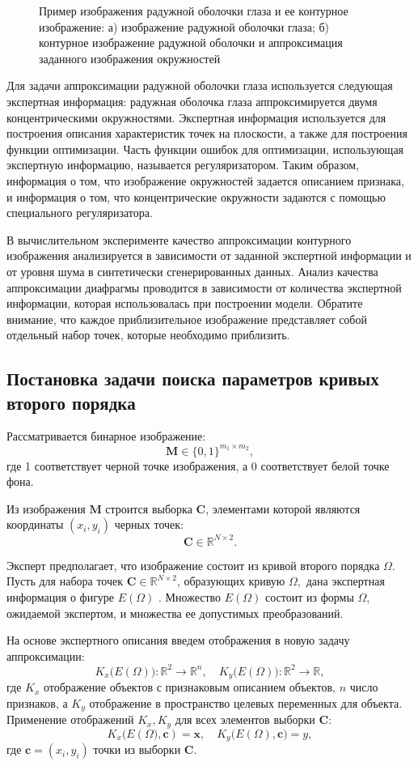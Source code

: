 \begin{figure}[h!]
\caption{Пример изображения радужной оболочки глаза и ее контурное изображение: а) изображение радужной оболочки глаза; б) контурное изображение радужной оболочки и аппроксимация заданного изображения окружностей}
\label{intro:fig1}
\end{figure}

Для задачи аппроксимации радужной оболочки глаза используется следующая экспертная информация: радужная оболочка глаза аппроксимируется двумя концентрическими окружностями. Экспертная информация используется для построения описания характеристик точек на плоскости, а также для построения функции оптимизации. Часть функции ошибок для оптимизации, использующая экспертную информацию, называется регуляризатором. Таким образом, информация о том, что изображение окружностей задается описанием признака, и информация о том, что концентрические окружности задаются с помощью специального регуляризатора.

В вычислительном эксперименте качество аппроксимации контурного изображения анализируется в зависимости от заданной экспертной информации и от уровня шума в синтетически сгенерированных данных. Анализ качества аппроксимации диафрагмы проводится в зависимости от количества экспертной информации, которая использовалась при построении модели. Обратите внимание, что каждое приблизительное изображение представляет собой отдельный набор точек, которые необходимо приблизить.

\subsection{Постановка задачи поиска параметров кривых второго порядка}
Рассматривается бинарное изображение:
\[
\mathbf{M} \in \{0, 1 \}^{m_1\times m_2},
\]
где 1 соответствует черной точке изображения, а 0 соответствует белой точке фона.

Из изображения $\mathbf{M}$ строится выборка $\mathbf{C}$, элементами которой являются координаты $(x_i, y_i)$ черных точек:
\[
\mathbf{C} \in\mathbb{R}^{N \times 2}.
\]

Эксперт предполагает, что изображение состоит из кривой второго порядка $\Omega$.
Пусть для набора точек $\mathbf{C}\in\mathbb{R}^{N \times 2}$, образующих кривую $\Omega,$ дана экспертная информация о фигуре $E(\Omega)$ .
Множество $E(\Omega)$ состоит из формы $\Omega$, ожидаемой экспертом, и множества ее допустимых преобразований.

На основе экспертного описания введем отображения в новую задачу аппроксимации:
\[
\label{eq1}
	K_{x}\bigl(E(\Omega)\bigr): \mathbb{R}^{2} \rightarrow \mathbb{R}^{n}, \quad K_{y}\bigl(E(\Omega)\bigr): \mathbb{R}^{2} \rightarrow \mathbb{R},
\] 
где $K_{x}$ отображение объектов с признаковым описанием объектов, $n$ число признаков, а $K_{y}$ отображение в пространство целевых переменных для объекта. Применение отображений $K_{x}, K_{y}$ для всех элементов выборки $\mathbf{C}$:
\[
\label{eq2}
	K_{x}\bigl(E(\Omega\bigr), \mathbf{c}) = \mathbf{x}, \quad  K_{y}\bigl(E(\Omega), \mathbf{c}\bigr) = y,
\]
где $\mathbf{c} = (x_i, y_i)$ точки из выборки $\mathbf{C}$.

